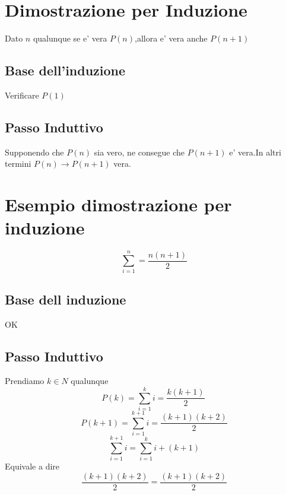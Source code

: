 \documentclass{article}
\begin{document}
   \section{Dimostrazione per Induzione}
   Dato $n$ qualunque se e' vera $P(n)$,allora e' vera anche $P(n+1)$
   \subsection{Base dell'induzione}
   Verificare $P(1)$
   \subsection{Passo Induttivo}
   Supponendo che $P(n)$ sia vero, ne consegue che $P(n+1)$ e' vera.In altri termini
   $P(n)\to P(n+1)$ vera.
   \section{Esempio dimostrazione per induzione}
   \begin{equation}
    \sum_{i=1}^n=\frac{n(n+1)}{2}
   \end{equation}
   \subsection{Base dell induzione}
   OK
   \subsection{Passo Induttivo}
   Prendiamo $k\in N$ qualunque
   \begin{equation}
     P(k)=\sum_{i=1}^k i= \frac{k(k+1)}{2}\
   \end{equation}
   \begin{equation}
     P(k+1)=\sum_{i=1}^{k+1} i= \frac{(k+1)(k+2)}{2}
   \end{equation}
   \begin{equation}
    \sum_{i=1}^{k+1} i=\sum_{i=1}^k i+(k+1)
   \end{equation}
   Equivale a dire
   \begin{equation}
    \frac{(k+1)(k+2)}{2}=\frac{(k+1)(k+2)}{2}
   \end{equation}
\end{document}
